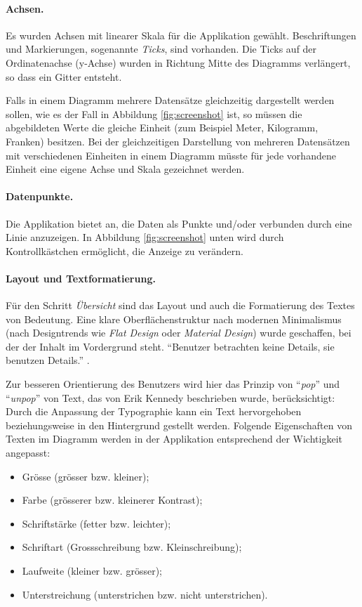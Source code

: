\paragraph{Achsen.} Es wurden Achsen mit linearer Skala für die Applikation gewählt. Beschriftungen und Markierungen, sogenannte \textit{Ticks}, sind vorhanden. Die Ticks auf der Ordinatenachse (y-Achse) wurden in Richtung Mitte des Diagramms verlängert, so dass ein Gitter entsteht.

Falls in einem Diagramm mehrere Datensätze gleichzeitig dargestellt werden sollen, wie es der Fall in Abbildung \ref{fig:screenshot} ist, so müssen die abgebildeten Werte die gleiche Einheit (zum Beispiel Meter, Kilogramm, Franken) besitzen. Bei der gleichzeitigen Darstellung von mehreren Datensätzen mit verschiedenen Einheiten in einem Diagramm müsste für jede vorhandene Einheit eine eigene Achse und Skala gezeichnet werden.

\paragraph{Datenpunkte.} Die Applikation bietet an, die Daten als Punkte und/oder verbunden durch eine Linie anzuzeigen. In Abbildung \ref{fig:screenshot} unten wird durch Kontrollkästchen ermöglicht, die Anzeige zu verändern.

\paragraph{Layout und Textformatierung.} Für den Schritt \textit{Übersicht} sind das Layout und auch die Formatierung des Textes von Bedeutung. Eine klare Oberflächenstruktur nach modernen Minimalismus (nach Designtrends wie \textit{Flat Design} oder \textit{Material Design}) wurde geschaffen, bei der der Inhalt im Vordergrund steht. "`Benutzer betrachten keine Details, sie benutzen Details."' \cite{minimalism}.

Zur besseren Orientierung des Benutzers wird hier das Prinzip von "`\textit{pop}"' und "`\textit{unpop}"' von Text, das von Erik Kennedy \cite{pop} beschrieben wurde, berücksichtigt: Durch die Anpassung der Typographie kann ein Text hervorgehoben beziehungsweise in den Hintergrund gestellt werden. Folgende Eigenschaften von Texten im Diagramm werden in der Applikation entsprechend der Wichtigkeit angepasst:

\begin{itemize}
	\item Grösse (grösser bzw. kleiner);
	\item Farbe (grösserer bzw. kleinerer Kontrast);
	\item Schriftstärke (fetter bzw. leichter);
	\item Schriftart (Grossschreibung bzw. Kleinschreibung);
	\item Laufweite (kleiner bzw. grösser);
	\item Unterstreichung (unterstrichen bzw. nicht unterstrichen).
\end{itemize}

